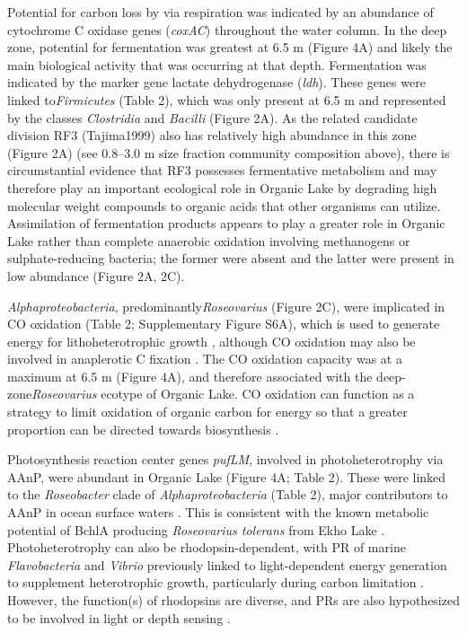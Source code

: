 Potential for carbon loss by via respiration was indicated by an abundance of cytochrome C oxidase genes (\emph{coxAC}) throughout the water column. 
In the deep zone, potential for fermentation was greatest at 6.5 m (Figure 4A) and likely the main biological activity that was occurring at that depth. 
Fermentation was indicated by the marker gene lactate dehydrogenase (\emph{ldh}).
These genes were linked to\emph{Firmicutes} (Table 2), which was only present at 6.5 m and represented by the classes \emph{Clostridia} and \emph{Bacilli} (Figure 2A). 
As the related candidate division RF3 (Tajima1999) also has relatively high abundance in this zone (Figure 2A)
(see 0.8--3.0 \textmu{}m size fraction community composition above), %
there is circumstantial evidence that RF3 possesses fermentative metabolism and may therefore play an important ecological role in Organic Lake by degrading high molecular weight compounds to organic acids that other organisms can utilize. 
Assimilation of fermentation products appears to play a greater role in Organic Lake rather than complete anaerobic oxidation involving methanogens or sulphate-reducing bacteria; the former were absent and the latter were present in low abundance (Figure 2A, 2C). 

\emph{Alphaproteobacteria}, predominantly\emph{Roseovarius} (Figure 2C), were implicated in CO oxidation (Table 2; Supplementary Figure S6A), which is used to generate energy for lithoheterotrophic growth \cite{Moran2007b}, although CO oxidation may also be involved in anaplerotic C fixation \cite{Moran2007b}. 
The CO oxidation capacity was at a maximum at 6.5 m (Figure 4A), and therefore associated with the deep-zone\emph{Roseovarius} ecotype of Organic Lake. 
CO oxidation can function as a strategy to limit oxidation of organic carbon for energy so that a greater proportion can be directed towards biosynthesis \cite{Moran2007b}.

Photosynthesis reaction center genes \emph{pufLM}, involved in photoheterotrophy via \ac{AAnP}, were abundant in Organic Lake (Figure 4A; Table 2). 
These were linked to the \emph{Roseobacter} clade of \emph{Alphaproteobacteria} (Table 2), major contributors to \ac{AAnP} in ocean surface waters \cite{Beja2002, Moran2007b}. 
This is consistent with the known metabolic potential of \ac{BchlA} producing \emph{Roseovarius tolerans} from Ekho Lake \cite{Labrenz1999}. 
Photoheterotrophy can also be rhodopsin-dependent, with \ac{PR} of marine \emph{Flavobacteria} and \emph{Vibrio} previously linked to light-dependent energy generation to supplement heterotrophic growth, particularly during carbon limitation \cite{Gomez-Consarnau2007, Gomez-Consarnau2010}. 
However, the function(s) of rhodopsins are diverse, and \acp{PR} are also hypothesized to be involved in light or depth sensing \cite{Fuhrman2008}. 

